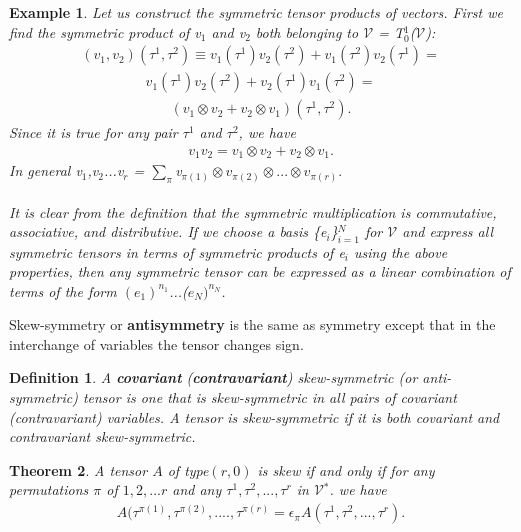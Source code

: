 \documentclass[12pt,a4paper]{article}
\newtheorem{thm}{Theorem}
\newtheorem{defn}[thm]{Definition}
\newtheorem{exmp}{Example}[section]
\begin{document}
\begin{exmp}
Let us construct the symmetric tensor products of vectors. First we find the symmetric product of v$_1$ and v$_2$ both belonging to $\mathcal{V}$ = T$_0^1$($\mathcal{V}$):
\begin{align*}
(v_1,v_2)(\tau^1,\tau^2) \equiv v_1(\tau^1)v_2(\tau^2) + v_1(\tau^2)v_2(\tau^1)=
\end{align*}
\begin{align*}
v_1(\tau^1)v_2(\tau^2) + v_2(\tau^1)v_1(\tau^2)=
\end{align*}
\begin{align*}
(v_1\otimes v_2 + v_2\otimes v_1)(\tau^1,\tau^2).
\end{align*}
Since it is true for any pair $\tau^1$ and $\tau^2$, we have 
\begin{align*}
v_1v_2 = v_1\otimes v_2 + v_2\otimes v_1.
\end{align*}
In general v$_1$,v$_2$...v$_r$ = $\sum_{\pi}$v$_{\pi(1)}\otimes v_{\pi(2)}\otimes ... \otimes v_{\pi(r)}.$\\\\
\hspace{1cm} It is clear from the definition that the symmetric multiplication is commutative, associative, and distributive. If we choose a basis \{e$_i$\}$_{i=1}^N$ for $\mathcal{V}$ and express all symmetric tensors in terms of symmetric products of e$_i$ using the above properties, then any symmetric tensor can be expressed as a linear combination of terms of the form $(e_1)^{n_1}$...($e_N)^{n_N}$.
\end{exmp}
\hspace{1cm} Skew-symmetry or \textbf{antisymmetry} is the same as symmetry except that in the interchange of variables the tensor changes sign.
\begin{defn}
A \textbf{covariant} (\textbf{contravariant}) skew-symmetric (or anti-symmetric) tensor is one that is skew-symmetric in all pairs of covariant (contravariant) variables. A tensor is skew-symmetric if it is both covariant
and contravariant skew-symmetric.
\end{defn}
\begin{thm}
A tensor $A$ of type$(r, 0)$ is skew if and only if for any permutations $\pi$ of $1, 2, ... r$ and any $\tau^1,\tau^2, ..., \tau^r$ in $\mathcal{V}$$^*$. we have
\begin{align*}
A(\tau^{\pi(1)},\tau^{\pi(2)},....,\tau^{\pi(r)} = \epsilon_\pi A(\tau^1,\tau^2,...,\tau^r).
\end{align*}
\end{thm}
\end{document}
